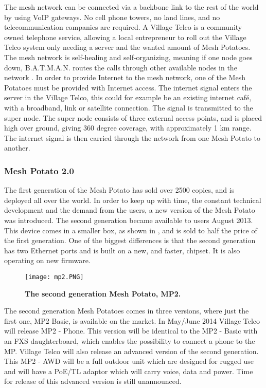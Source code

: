 The mesh network can be connected via a backbone link to the rest of the world by using VoIP gateways. No cell phone towers, no land lines, and no telecommunication companies are required. A Village Telco is a community owned telephone service, allowing a local entrepreneur to roll out the Village Telco system only needing a server and the wanted amount of Mesh Potatoes. The mesh network is self-healing and self-organizing, meaning if one node goes down, B.A.T.M.A.N. routes the calls through other available nodes in the network \cite{MPbyRowe}. In order to provide Internet to the mesh network, one of the Mesh Potatoes must be provided with Internet access. The internet signal enters the server in the Village Telco, this could for example be an existing internet café, with a broadband, link or satellite connection. The signal is transmitted to the super node. The super node consists of three external access points, and is placed high over ground, giving 360 degree coverage, with approximately 1 km range. The internet signal is then carried through the network from one Mesh Potato to another. 


\subsubsection{Mesh Potato 2.0}
The first generation of the Mesh Potato has sold over 2500 copies, and is deployed all over the world. In order to keep up with time, the constant technical development and the demand from the users, a new version of the Mesh Potato was introduced. The second generation became available to users August 2013. This device comes in a smaller box, as shown in , and is sold to half the price of the first generation. One of the biggest differences is that the second generation has two Ethernet ports and is built on a new, and faster, chipset. It is also  operating on new firmware.

\begin{figure}[h!]
  \centering
      \texttt{[image: mp2.PNG]}
  \caption [MP2]{\textbf{The second generation Mesh Potato, MP2.}}
  \label{fig:MP02}
\end{figure}

The second generation Mesh Potatoes comes in three versions, where just the first one, MP2 Basic, is available on the market. In May/June 2014 Village Telco will release MP2 - Phone. This version will be identical to the MP2 - Basic with an FXS daughterboard, which enables the possibility to connect a phone to the MP. Village Telco will also release an advanced version of the second generation. This MP2 - AWD will be a full outdoor unit which are designed for rugged use and will have a PoE/TL adaptor which will carry voice, data and power. Time for release of this advanced version is still unannounced. 

